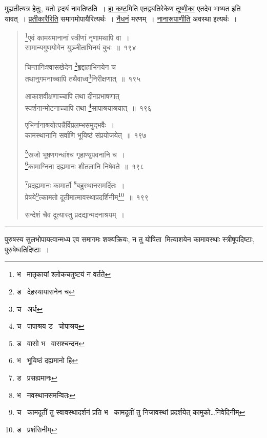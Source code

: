 \documentclass[11pt, openany]{book}
\begin{document}
\vspace{2mm}
\noindent
मुह्यतीत्यत्र हेतुः, यतो हृदयं नावतिष्ठति~। \underline{हा कष्ट}मिति एतद्व्यतिरेकेण \underline{तूष्णीका} एतदेव भाष्यत इति यावत्~। \underline{प्रतीकारैरिति} समागमोपायैरित्यर्थः~। \underline{नैधनं} मरणम्~। \underline{नानारूपाणीति} अवस्था इत्यर्थः~।

\newpage

\begin{quote}
{\na \renewcommand{\thefootnote}{1}\footnote{भ \textendash\  मातृकायां श्लोकचतुष्टयं न वर्तते}एवं कामयमानानां स्त्रीणां नृणामथापि वा~।\\
सामान्यगुणयोगेन युञ्जीताभिनयं बुधः~॥~१९४

चिन्तानिःश्वासखेदेन \renewcommand{\thefootnote}{2}\footnote{ड \textendash\  देहस्यायासनेन च}हृद्दाहाभिनयेन च\\
तथानुगमनाच्चापि तथैवाध्व\renewcommand{\thefootnote}{3}\footnote{च \textendash\  अर्ध}निरीक्षणात्~॥~१९५

आकाशवीक्षणाच्चापि तथा दीनप्रभाषणात्\\
स्पर्शनान्मोटनाच्चापि तथा \renewcommand{\thefootnote}{4}\footnote{च \textendash\  पापाश्रय ड \textendash\  चोपाश्रय}सापाश्रयाश्रयात्~॥~१९६

एभिर्नानाश्रयोत्पन्नैर्विप्रलम्भसमुद्भवैः~।\\
कामस्थानानि सर्वाणि भूयिष्ठं संप्रयोजयेत्~॥~१९७

\renewcommand{\thefootnote}{5}\footnote{ड \textendash\  वासो भ \textendash\  वासश्चन्दन}स्रजो भूषणगन्धांश्च गृहाण्युपवनानि च~।\\
\renewcommand{\thefootnote}{6}\footnote{भ \textendash\  भूयिष्ठं दह्यमानो हि}कामाग्निना दह्यमानः शीतलानि निषेवते~॥~१९८

\renewcommand{\thefootnote}{7}\footnote{ड \textendash\  प्रसह्यमानः}प्रदह्यमानः कामार्तो \renewcommand{\thefootnote}{8}\footnote{भ \textendash\  नवस्थानसमन्वितः}बहुस्थानसमर्दितः~।\\
प्रेषये\renewcommand{\thefootnote}{9}\footnote{च \textendash\  कामदूतीं तु स्वावस्थादर्शनं प्रति भ \textendash\  कामदूतीं तु निजावस्थां प्रदर्शयेत् कामुको\ldots निवेदिनीम्}त्कामतो दूतीमात्मावस्थाप्रदर्शिनीम्\renewcommand{\thefootnote}{10}\footnote{ड \textendash\  प्रशंसिनीम्}~॥~१९९

सन्देशं चैव दूत्यास्तु प्रदद्यान्मदनाश्रयम्~।}
\end{quote}

\hrule

\vspace{2mm}
पुरुषस्य सुलभोपायत्वान्मध्य एव समागमः शक्यक्रियः, न तु योषिता\textendash\ मित्याशयेन कामावस्थाः स्त्रीषूपदिष्टाः, पुरुषेष्वतिदिष्टाः~।\\
\end{document}
